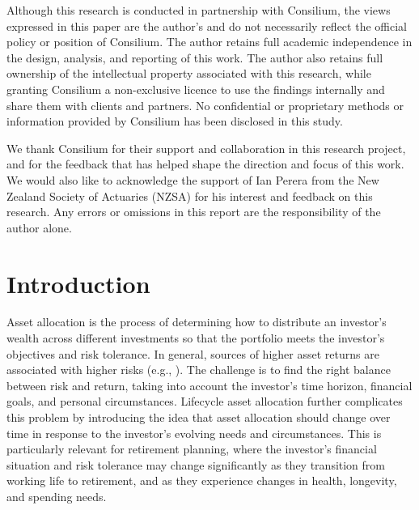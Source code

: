 \documentclass[11pt]{article}
\begin{document}
Although this research is conducted in partnership with Consilium, the views expressed in this paper are the author's and do not necessarily reflect the official policy or position of Consilium. The author retains full academic independence in the design, analysis, and reporting of this work. The author also retains full ownership of the intellectual property associated with this research, while granting Consilium a non-exclusive licence to use the findings internally and share them with clients and partners. No confidential or proprietary methods or information provided by Consilium has been disclosed in this study.

We thank Consilium for their support and collaboration in this research project, and for the feedback that has helped shape the direction and focus of this work. We would also like to acknowledge the support of Ian Perera from the New Zealand Society of Actuaries (NZSA) for his interest and feedback on this research. Any errors or omissions in this report are the responsibility of the author alone.


\tableofcontents

\section{Introduction}

Asset allocation is the process of determining how to distribute an investor's wealth across different investments so that the portfolio meets the investor's objectives and risk tolerance. 
In general, sources of higher asset returns are associated with higher risks (e.g., \parencite{lundbladRiskAndReturns, campbellRiskAndReturns, ghyselsRiskAndReturns}). The challenge is to find the right balance between risk and return, taking into account the investor's time horizon, financial goals, and personal circumstances. Lifecycle asset allocation further complicates this problem by introducing the idea that asset allocation should change over time in response to the investor's evolving needs and circumstances. This is particularly relevant for retirement planning, where the investor's financial situation and risk tolerance may change significantly as they transition from working life to retirement, and as they experience changes in health, longevity, and spending needs.
\end{document}
